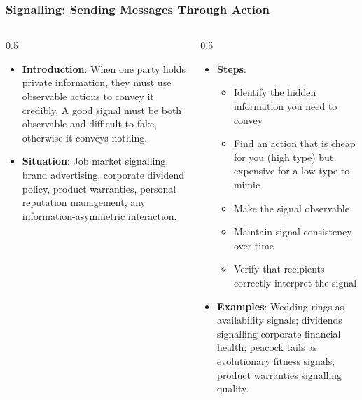 \begin{frame}[fragile]\frametitle{Signalling: Sending Messages Through Action}
\begin{columns}
    \begin{column}[T]{0.5\linewidth}
      \begin{itemize}
        \item \textbf{Introduction}: When one party holds private information, they must use observable actions to convey it credibly. A good signal must be both observable and difficult to fake, otherwise it conveys nothing.
        \item \textbf{Situation}: Job market signalling, brand advertising, corporate dividend policy, product warranties, personal reputation management, any information-asymmetric interaction.
      \end{itemize}
    \end{column}
    \begin{column}[T]{0.5\linewidth}
      \begin{itemize}
        \item \textbf{Steps}:
        \begin{itemize}
          \item Identify the hidden information you need to convey
          \item Find an action that is cheap for you (high type) but expensive for a low type to mimic
          \item Make the signal observable
          \item Maintain signal consistency over time
          \item Verify that recipients correctly interpret the signal
        \end{itemize}\item \textbf{Examples}: Wedding rings as availability signals; dividends signalling corporate financial health; peacock tails as evolutionary fitness signals; product warranties signalling quality.
      \end{itemize}
    \end{column}
  \end{columns}
\end{frame}

